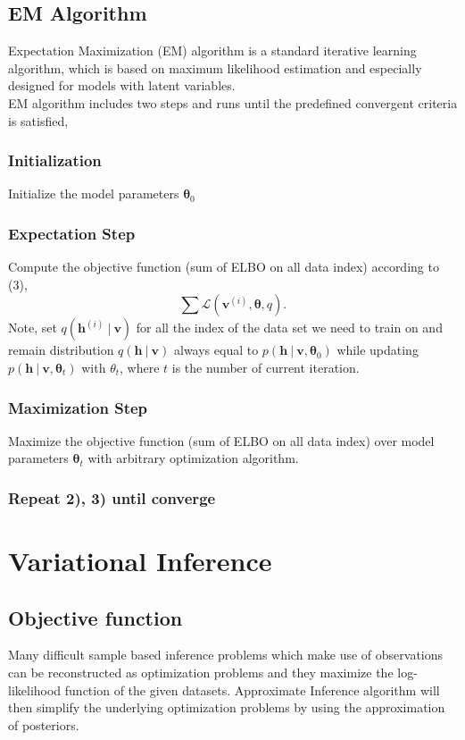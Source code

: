 \documentclass[conference]{IEEEtran}
\begin{document}
\subsection{EM Algorithm}
Expectation Maximization (EM) \cite{moon1996expectation} algorithm is a standard iterative learning algorithm, which is based on maximum likelihood estimation and especially designed for models with latent variables. \\

EM algorithm includes two steps and runs until the predefined convergent criteria is satisfied,
\subsubsection{Initialization}
Initialize the model parameters $\boldsymbol{\theta}_0$
\subsubsection{Expectation Step}
Compute the objective function (sum of ELBO on all data index) according to (3), 
\begin{equation}
\sum\mathcal{L}(\boldsymbol{v}^{(i)}, \boldsymbol{\theta}, q).
\end{equation}
Note, set $q(\boldsymbol{h}^{(i)}\ |\ \boldsymbol{v})$ for all the index of the data set we need to train on and remain distribution $q(\boldsymbol{h}\ |\ \boldsymbol{v})$ always equal to $p(\boldsymbol{h}\ |\ \boldsymbol{v}, \boldsymbol{\theta}_0)$ while updating $p(\boldsymbol{h}\ |\ \boldsymbol{v}, \boldsymbol{\theta}_t)$ with $\theta_t$, where $t$ is the number of current iteration.
\subsubsection{Maximization Step}
Maximize the objective function (sum of ELBO on all data index) over model parameters $\boldsymbol{\theta}_t$ with arbitrary optimization algorithm.
\subsubsection{Repeat 2), 3) until converge}
\section{Variational Inference}
\subsection{Objective function}
Many difficult sample based inference problems which make use of observations can be reconstructed as optimization problems and they maximize the log-likelihood function of the given datasets.\cite{doersch2016tutorial}\cite{anzai2012pattern} Approximate Inference algorithm will then simplify the underlying optimization problems by using the approximation of posteriors. \\
\end{document}

